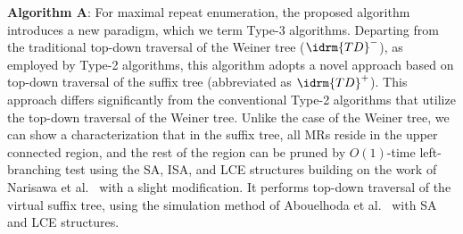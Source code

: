 \textbf{Algorithm A}: 
For maximal repeat enumeration, the proposed algorithm introduces a new paradigm, which we term Type-3 algorithms. Departing from the traditional top-down traversal of the Weiner tree ($\idrm{TD}^-$), as employed by Type-2 algorithms, this algorithm adopts a novel approach based on top-down traversal of the suffix tree (abbreviated as $\idrm{TD}^+$). 
This approach differs significantly from the conventional Type-2 algorithms that utilize the top-down traversal of the Weiner tree.
Unlike the case of the Weiner tree, we can show a characterization that in the suffix tree, all MRs reside in the upper connected region, and the rest of the region can be pruned by $O(1)$-time left-branching test using the SA, ISA, and LCE structures building on the work of Narisawa et al.~\cite{narisawa2007efficient} with a slight modification. It performs top-down traversal of the virtual suffix tree, using the simulation method of Abouelhoda et al.~\cite{abouelhoda2004replacing} with SA and LCE structures. 


